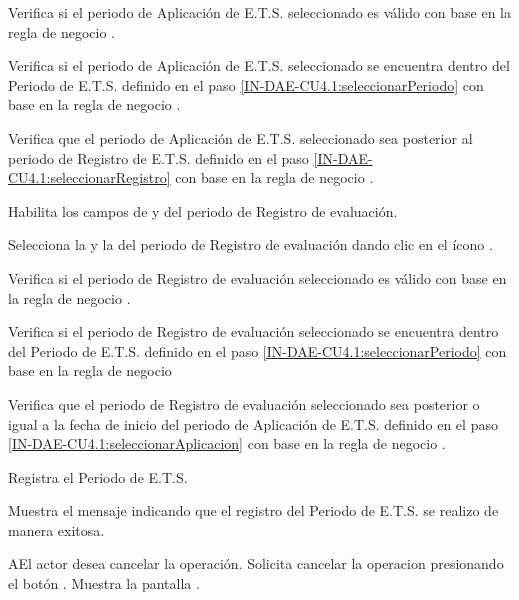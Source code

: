 \begin{UCtrayectoria}
	\UCpaso Verifica si el periodo de Aplicación de E.T.S. seleccionado es válido con base en la regla de negocio . 
	
	\UCpaso Verifica si el periodo de Aplicación de E.T.S. seleccionado se encuentra dentro del
	Periodo de E.T.S. definido en el paso \ref{IN-DAE-CU4.1:seleccionarPeriodo} con base en la regla de negocio . 
	
	\UCpaso Verifica que el periodo de Aplicación de E.T.S. seleccionado sea posterior al periodo de Registro de E.T.S. definido en el paso \ref{IN-DAE-CU4.1:seleccionarRegistro} con base en la regla de negocio . 
	
	\UCpaso Habilita los campos de  y  del periodo de Registro de evaluación.
	
	\UCpaso[\UCactor]  \label{IN-DAE-CU4.1:seleccionarEvaluacion}Selecciona la  y la  del periodo de Registro de evaluación dando clic en el ícono \IUCalendario.
	
	\UCpaso Verifica si el periodo de Registro de evaluación seleccionado es válido con base en la regla de negocio . 
	
	\UCpaso Verifica si el periodo de Registro de evaluación seleccionado se encuentra dentro del
	Periodo de E.T.S. definido en el paso \ref{IN-DAE-CU4.1:seleccionarPeriodo} con base en la regla de negocio  
	
	\UCpaso Verifica que el periodo de Registro de evaluación seleccionado sea posterior o igual a la fecha de inicio del periodo de Aplicación de E.T.S. definido en el paso \ref{IN-DAE-CU4.1:seleccionarAplicacion} con base en la regla de negocio . 
	
	\UCpaso Registra el Periodo de E.T.S.
	
	\UCpaso Muestra el mensaje  indicando que el registro del Periodo de E.T.S. se realizo de manera exitosa.
	
\end{UCtrayectoria}


\begin{UCtrayectoriaA}{A}{El actor desea cancelar la operación.}
	\UCpaso[\UCactor] Solicita cancelar la operacion presionando el botón .
	\UCpaso Muestra la pantalla .
\end{UCtrayectoriaA}
